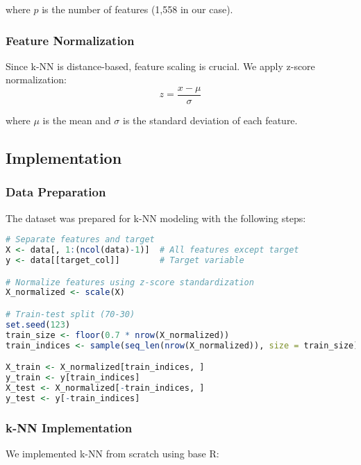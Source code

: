 where $p$ is the number of features (1,558 in our case).

\subsubsection{Feature Normalization}
Since k-NN is distance-based, feature scaling is crucial. We apply z-score normalization:
\begin{equation}
z = \frac{x - \mu}{\sigma}
\end{equation}

where $\mu$ is the mean and $\sigma$ is the standard deviation of each feature.

\subsection{Implementation}
\subsubsection{Data Preparation}
The dataset was prepared for k-NN modeling with the following steps:

\begin{lstlisting}[language=R]
# Separate features and target
X <- data[, 1:(ncol(data)-1)]  # All features except target
y <- data[[target_col]]        # Target variable

# Normalize features using z-score standardization
X_normalized <- scale(X)

# Train-test split (70-30)
set.seed(123)
train_size <- floor(0.7 * nrow(X_normalized))
train_indices <- sample(seq_len(nrow(X_normalized)), size = train_size)

X_train <- X_normalized[train_indices, ]
y_train <- y[train_indices]
X_test <- X_normalized[-train_indices, ]
y_test <- y[-train_indices]
\end{lstlisting}

\subsubsection{k-NN Implementation}
We implemented k-NN from scratch using base R:

